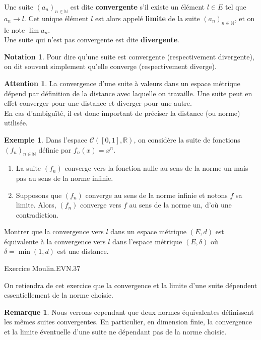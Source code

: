 \documentclass[french]{article}
\newcommand{\N}{\mathbb{N}}
\newcommand{\R}{\mathbb{R}}
\theoremstyle{plain}
\theoremstyle{definition}
\newtheorem*{ex}{Exemple}
\newtheorem*{rmq}{Remarque}
\newtheorem*{notation}{Notation}
\newtheorem*{attention}{Attention}
\theoremstyle{remark}
\begin{document}
\begin{dfn}
	Une suite $(a_n)_{n\in\N}$ est dite \textbf{convergente} s'il existe un élément $l\in E$ tel que $a_n\to l$. Cet unique élément $l$ est alors appelé \textbf{limite} de la suite $(a_n)_{n\in\N}$, et on le note $\lim a_n$. \\
	Une suite qui n'est pas convergente est dite \textbf{divergente}.
\end{dfn}

\begin{notation}
	Pour dire qu'une suite est convergente (respectivement divergente), on dit souvent simplement qu'elle converge (respectivement diverge).
\end{notation}

\begin{attention} 
	La convergence d'une suite à valeurs dans un espace métrique dépend par définition de la distance avec laquelle on travaille. Une suite peut en effet converger pour une distance et diverger pour une autre.\\
En cas d'ambiguïté, il est donc important de préciser la distance (ou norme) utilisée.
\end{attention}

\begin{ex}
	Dans l'espace $\mathcal{C}([0,1],\R)$, on considère la suite de fonctions $(f_n)_{n\in\N}$ définie par $f_n(x)=x^n$.
	\begin{enumerate}
		\item La suite $(f_n)$ converge vers la fonction nulle au sens de la norme un mais pas au sens de la norme infinie.
		\item Supposons que $(f_n)$ converge au sens de la norme infinie et notons $f$ sa limite. Alors, $(f_n)$ converge vers $f$ au sens de la norme un, d'où une contradiction.
	\end{enumerate}
\end{ex}

\begin{exo}
	Montrer que la convergence vers $l$ dans un espace métrique $(E,d)$ est équivalente à la convergence vers $l$ dans l'espace métrique $(E,\delta)$ où $\delta=\min(1,d)$ est une distance.
\end{exo}

Exercice Moulin.EVN.37

On retiendra de cet exercice que la convergence et la limite d'une suite dépendent essentiellement de la norme choisie.

\begin{rmq}
	Nous verrons cependant que deux normes équivalentes définissent les mêmes suites convergentes. En particulier, en dimension finie, la convergence et la limite éventuelle d'une suite ne dépendant pas de la norme choisie.
\end{rmq}
\end{document}
